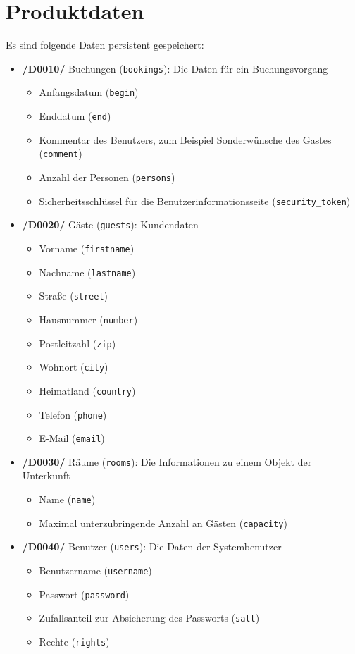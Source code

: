 \documentclass[a4paper,oneside,10pt]{scrreprt}
\begin{document}
\chapter{Produktdaten}
Es sind folgende Daten persistent gespeichert:

\begin{itemize}
\item \textbf{/D0010/} Buchungen (\texttt{bookings}): Die Daten für ein Buchungsvorgang
    \begin{itemize}
    \item Anfangsdatum (\texttt{begin})
    \item Enddatum (\texttt{end})
    \item Kommentar des Benutzers, zum Beispiel Sonderwünsche des Gastes (\texttt{comment})
    \item Anzahl der Personen (\texttt{persons})
    \item Sicherheitsschlüssel für die Benutzerinformationsseite 
            (\texttt{security\_token})
    \end{itemize}

\item \textbf{/D0020/} Gäste (\texttt{guests}): Kundendaten
    \begin{itemize}
    \item Vorname (\texttt{firstname})
    \item Nachname (\texttt{lastname})
    \item Straße (\texttt{street})
    \item Hausnummer (\texttt{number})
    \item Postleitzahl (\texttt{zip})
    \item Wohnort (\texttt{city})
    \item Heimatland (\texttt{country})
    \item Telefon (\texttt{phone})
    \item E-Mail (\texttt{email})
    \end{itemize}

\item \textbf{/D0030/} Räume (\texttt{rooms}): Die Informationen zu einem Objekt der Unterkunft
    \begin{itemize}
    \item Name (\texttt{name})
    \item Maximal unterzubringende Anzahl an Gästen (\texttt{capacity})
    \end{itemize}

\item \textbf{/D0040/} Benutzer (\texttt{users}): Die Daten der Systembenutzer
    \begin{itemize}
    \item Benutzername (\texttt{username})
    \item Passwort (\texttt{password})
    \item Zufallsanteil zur Absicherung des Passworts (\texttt{salt})
    \item Rechte (\texttt{rights})
    \end{itemize}
\end{itemize}
\end{document}
